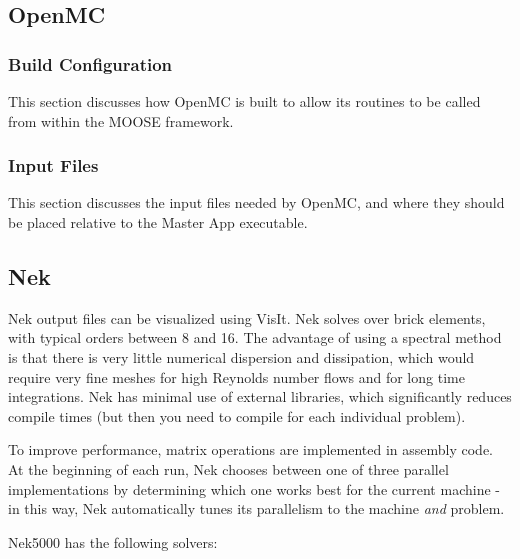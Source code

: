 \documentclass[10pt]{article}
\numberwithin{equation}{section} %
\begin{document}
\subsection{OpenMC}

\subsubsection{Build Configuration}
This section discusses how OpenMC is built to allow its routines to be called from within the MOOSE framework.

\subsubsection{Input Files}
This section discusses the input files needed by OpenMC, and where they should be placed relative to the Master App executable.

\subsection{Nek}

Nek output files can be visualized using VisIt. Nek solves over brick elements, with typical orders between 8 and 16. The advantage of using a spectral method is that there is very little numerical dispersion and dissipation, which would require very fine meshes for high Reynolds number flows and for long time integrations. Nek has minimal use of external libraries, which significantly reduces compile times (but then you need to compile for each individual problem). 

To improve performance, matrix operations are implemented in assembly code. At the beginning of each run, Nek chooses between one of three parallel implementations by determining which one works best for the current machine - in this way, Nek automatically tunes its parallelism to the machine {\it and} problem.

Nek5000 has the following solvers:
\end{document}
